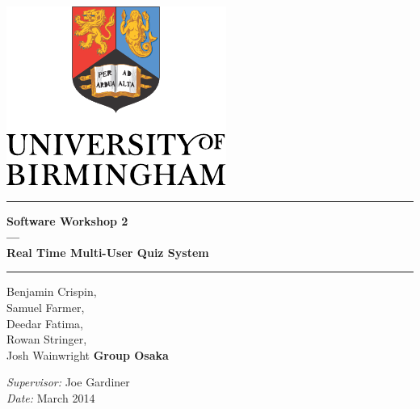 \begin{titlepage}
	\begin{center}
	\vspace*{\fill}

	\centering
	\includegraphics[scale=1.0]{Logo.pdf}
	\vfill

	\hrule
	{\LARGE\bf Software Workshop 2 \\
		--- \\
		Real Time Multi-User Quiz System\\[0.4cm]}
	\hrule

	\vfill

	\vfill
		Benjamin Crispin,\\
		Samuel Farmer,\\
		Deedar Fatima,\\
		Rowan Stringer,\\
		Josh Wainwright
	\vfill
		\textbf{Group Osaka}
	\vfill

	\vfill
	\textit{Supervisor:} Joe Gardiner \\
	\vfill
	\textit{Date:} March 2014
	\vfill
	\vfill

	\end{center}
\end{titlepage}


